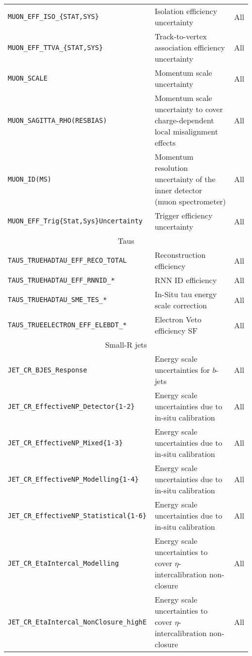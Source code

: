\begin{table}
{\begin{tabular}{llr}
        \texttt{MUON\_EFF\_ISO\_\{STAT,SYS\} }& {Isolation efficiency uncertainty} & All \\
        \texttt{MUON\_EFF\_TTVA\_\{STAT,SYS\} }& {Track-to-vertex association efficiency uncertainty} & All \\
        \texttt{MUON\_SCALE}&    Momentum scale uncertainty & All \\
        \texttt{MUON\_SAGITTA\_RHO(RESBIAS)} & Momentum scale uncertainty to cover charge-dependent local misalignment effects & All \\
        \texttt{MUON\_ID(MS) }& Momentum resolution uncertainty of the inner detector (muon spectrometer) & All \\
        \texttt{MUON\_EFF\_Trig\{Stat,Sys\}Uncertainty} & Trigger efficiency uncertainty & All \\
        \hline
        \multicolumn{3}{c}{Taus}\\
        \hline
        \texttt{TAUS\_TRUEHADTAU\_EFF\_RECO\_TOTAL}& {Reconstruction efficiency} & All \\
        \texttt{TAUS\_TRUEHADTAU\_EFF\_RNNID\_*}& {RNN ID efficiency} & All \\
        \texttt{TAUS\_TRUEHADTAU\_SME\_TES\_*}& {In-Situ tau energy scale correction} & All \\
        \texttt{TAUS\_TRUEELECTRON\_EFF\_ELEBDT\_*}& {Electron Veto efficiency SF} & All \\
        \hline
        \multicolumn{3}{c}{Small-R jets}\\
        \hline
        \texttt{JET\_CR\_BJES\_Response }& Energy scale uncertainties for $b$-jets & All \\
        \texttt{JET\_CR\_EffectiveNP\_Detector\{1-2\} }& Energy scale uncertainties due to in-situ calibration & All \\
        \texttt{JET\_CR\_EffectiveNP\_Mixed\{1-3\} }& Energy scale uncertainties due to in-situ calibration & All  \\
        \texttt{JET\_CR\_EffectiveNP\_Modelling\{1-4\} }& Energy scale uncertainties due to in-situ calibration & All \\
        \texttt{JET\_CR\_EffectiveNP\_Statistical\{1-6\} }& Energy scale uncertainties due to in-situ calibration & All \\
        \texttt{JET\_CR\_EtaIntercal\_Modelling}& Energy scale uncertainties to cover $\eta$-intercalibration non-closure & All \\
        \texttt{JET\_CR\_EtaIntercal\_NonClosure\_highE}& Energy scale uncertainties to cover $\eta$-intercalibration non-closure & All \\

\end{tabular}}
\end{table}

